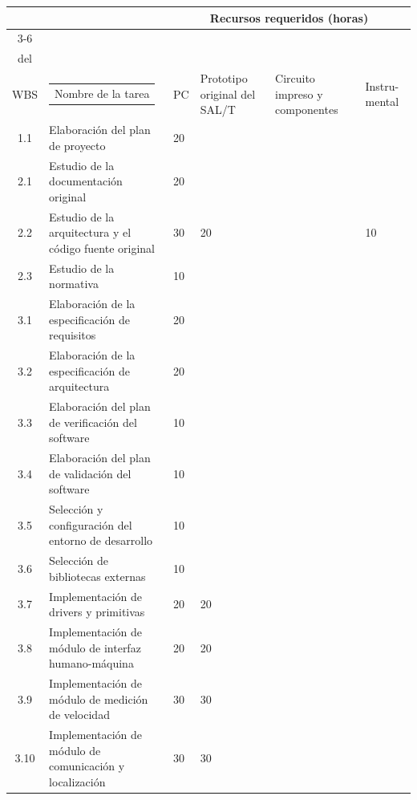 \documentclass[11pt]{charter}
\begin{document}
\begin{table}[!htpb]
\begin{center}
  \begin{tabularx}{\linewidth}{@{}|c|X|m{0.8cm}|m{1.4cm}|m{1.3cm}|m{1.1cm}|@{}}
  \hline
  \cellcolor[HTML]{C0C0C0} & \cellcolor[HTML]{C0C0C0} & \multicolumn{4}{c|}{\cellcolor[HTML]{C0C0C0}Recursos requeridos (horas)} \\ \cline{3-6} 
  \multirow{-2}{*}{\cellcolor[HTML]{C0C0C0}\begin{tabular}[c]{@{}c@{}}Tarea\\del\\WBS\end{tabular}} & \multirow{-2}{*}{\cellcolor[HTML]{C0C0C0}\begin{tabular}[c]{@{}c@{}}Nombre de la tarea\end{tabular}} & PC & Prototipo original del SAL/T & Circuito impreso y componentes & Instru- mental \\ \hline
  1.1 & Elaboración del plan de proyecto & 20 & & & \\ \hline
  2.1 & Estudio de la documentación original & 20 & & & \\ \hline
  2.2 & Estudio de la arquitectura y el código fuente original & 30 & 20 & & 10 \\ \hline
  2.3 & Estudio de la normativa & 10 & & & \\ \hline
  3.1 & Elaboración de la especificación de requisitos & 20 & & & \\ \hline
  3.2 & Elaboración de la especificación de arquitectura & 20 & & & \\ \hline
  3.3 & Elaboración del plan de verificación del software & 10 & & & \\ \hline
  3.4 & Elaboración del plan de validación del software & 10 & & & \\ \hline
  3.5 & Selección y configuración del entorno de desarrollo & 10 & & & \\ \hline
  3.6 & Selección de bibliotecas externas & 10 & & & \\ \hline
  3.7 & Implementación de drivers y primitivas & 20 & 20 & & \\ \hline
  3.8 & Implementación de módulo de interfaz humano-máquina & 20 & 20 & & \\ \hline
  3.9  & Implementación de módulo de medición de velocidad & 30 & 30 & & \\ \hline
  3.10 & Implementación de módulo de comunicación y localización & 30 & 30 & & \\ \hline

\end{tabularx}
\end{center}
\end{table}
\end{document}

